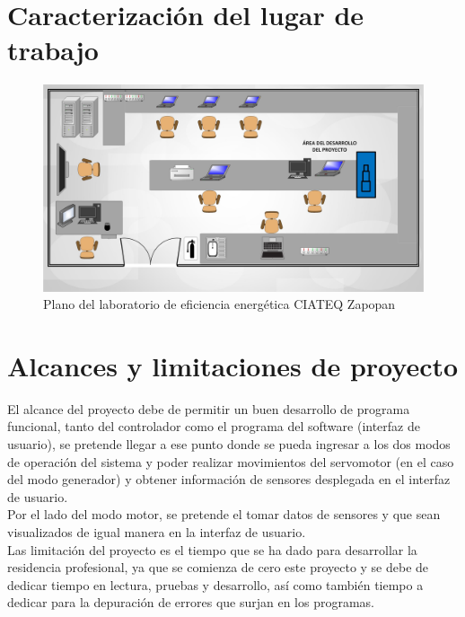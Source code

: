\documentclass[12pt,titlepage]{article}
\begin{document}
\section{Caracterización del lugar de trabajo}
\begin{figure}[htbp]
\hspace*{-.15cm} 
\includegraphics[scale=0.245]{lab2}
\caption{Plano del laboratorio de eficiencia energética CIATEQ Zapopan }
\end{figure}
\newpage
\section{Alcances y limitaciones de proyecto}
El alcance del proyecto debe de permitir un buen desarrollo de programa funcional, tanto del controlador como el programa del software (interfaz de usuario), se pretende llegar a ese punto donde se pueda ingresar a los dos modos de operación del sistema y poder realizar movimientos del servomotor (en el caso del modo generador) y obtener información de sensores desplegada en el interfaz de usuario. \\[2.5mm]
Por el lado del modo motor, se pretende el tomar datos de sensores y que sean visualizados de igual manera en la interfaz de usuario. \\[0.1mm]


Las limitación del proyecto es el tiempo que se ha dado para desarrollar la residencia profesional, ya que se comienza de cero este proyecto y se debe de dedicar tiempo en lectura, pruebas y desarrollo, así como también tiempo a dedicar para la depuración de errores que surjan en los programas. \\[0.8mm]
\end{document}
